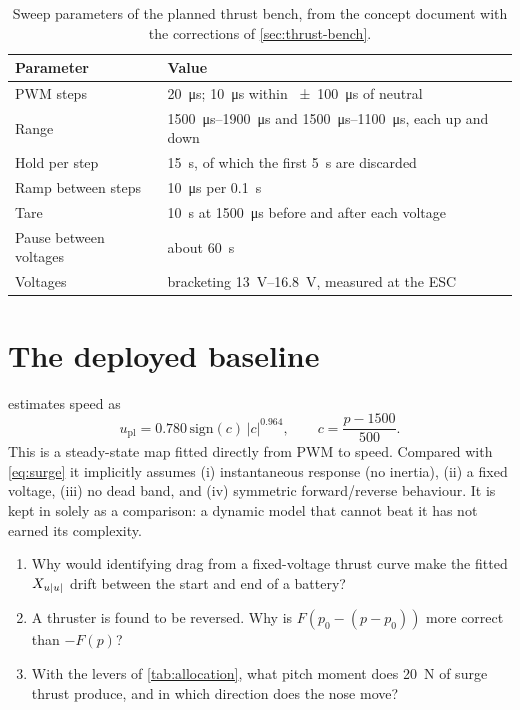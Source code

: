 \begin{table}[htbp]
\centering
\caption{Sweep parameters of the planned thrust bench, from the concept document with the
corrections of \cref{sec:thrust-bench}.}
\label{tab:bench-procedure}
\begin{tabular}{ll}
\toprule
Parameter & Value \\
\midrule
PWM steps & \qty{20}{\micro\second}; \qty{10}{\micro\second} within \qty{\pm 100}{\micro\second} of neutral \\
Range & \qtyrange{1500}{1900}{\micro\second} and \qtyrange{1500}{1100}{\micro\second}, each up and down \\
Hold per step & \qty{15}{\second}, of which the first \qty{5}{\second} are discarded \\
Ramp between steps & \qty{10}{\micro\second} per \qty{0.1}{\second} \\
Tare & \qty{10}{\second} at \qty{1500}{\micro\second} before and after each voltage \\
Pause between voltages & about \qty{60}{\second} \\
Voltages & bracketing \qtyrange{13}{16.8}{\volt}, measured at the ESC \\
\bottomrule
\end{tabular}
\end{table}
\FloatBarrier

\section{The deployed baseline}

 estimates speed as
\begin{equation}
  u_\mathrm{pl} = 0.780\,\mathrm{sign}(c)\,|c|^{0.964}, \qquad c = \frac{p - 1500}{500}.
  \label{eq:powerlaw}
\end{equation}
This is a steady-state map fitted directly from PWM to speed. Compared with
\eqref{eq:surge} it implicitly assumes (i) instantaneous response (no inertia), (ii) a fixed
voltage, (iii) no dead band, and (iv) symmetric forward/reverse behaviour. It is kept in
 solely as a comparison: a dynamic model that cannot beat it
has not earned its complexity.

\begin{questions}
\begin{enumerate}
  \item Why would identifying drag from a fixed-voltage thrust curve make the fitted $X_{u|u|}$
        drift between the start and end of a battery?
  \item A thruster is found to be reversed. Why is $F(p_0 - (p - p_0))$ more correct than
        $-F(p)$?
  \item With the levers of \cref{tab:allocation}, what pitch moment does \qty{20}{\newton} of
        surge thrust produce, and in which direction does the nose move?
\end{enumerate}
\end{questions}
